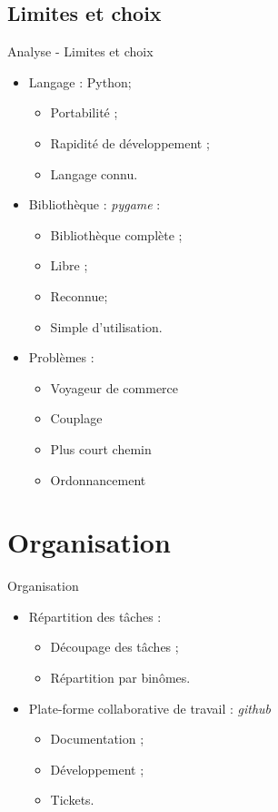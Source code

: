 \documentclass{beamer}
\begin{document}
	\subsection{Limites et choix}
		\begin{frame}{Analyse - Limites et choix}
			\begin{itemize}
				\setlength{\itemsep}{0.3cm}
				\item Langage : Python;
					\begin{itemize}
						\item Portabilité ;
						\item Rapidité de développement ;
						\item Langage connu.
					\end{itemize}
				\item Bibliothèque : \emph{pygame} :
					\begin{itemize}
						\item Bibliothèque complète ;
						\item Libre ;
						\item Reconnue;
						\item Simple d'utilisation.
					\end{itemize}
				\item Problèmes :
					\begin{itemize}
						\item Voyageur de commerce
						\item Couplage
						\item Plus court chemin
						\item Ordonnancement
					\end{itemize}
			\end{itemize}
		\end{frame}
\section{Organisation}
	\begin{frame}{Organisation}
		\begin{itemize}
			\setlength{\itemsep}{0.75cm}
			\item Répartition des tâches :
			\begin{itemize}
			\setlength{\itemsep}{0.3cm}
				\item Découpage des tâches ;
				\item Répartition par binômes.
			\end{itemize}
			\item Plate-forme collaborative de travail : \emph{github}
			\begin{itemize}
			\setlength{\itemsep}{0.3cm}
				\item Documentation ;
				\item Développement ;
				\item Tickets.
			\end{itemize}
		\end{itemize}
	\end{frame}
\end{document}
